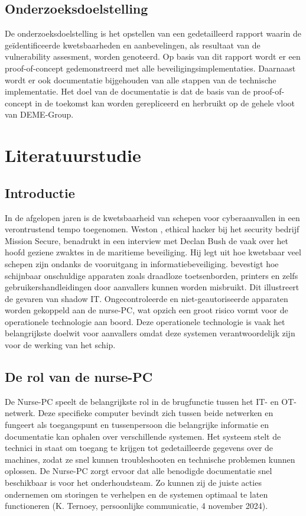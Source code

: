 \subsection{Onderzoeksdoelstelling}
De onderzoeksdoelstelling is het opstellen van een gedetailleerd rapport waarin de geïdentificeerde kwetsbaarheden en aanbevelingen, als resultaat van de vulnerability assesment, worden genoteerd.
Op basis van dit rapport wordt er een proof-of-concept gedemonstreerd met alle beveiligingsimplementaties.
Daarnaast wordt er ook documentatie bijgehouden van alle stappen van de technische implementatie.
Het doel van de documentatie is dat de basis van de proof-of-concept in de toekomst kan worden gerepliceerd en herbruikt op de gehele vloot van DEME-Group.



\section{Literatuurstudie}%
\label{sec:literatuurstudie}
\subsection{Introductie}
In de afgelopen jaren is de kwetsbaarheid van schepen voor cyberaanvallen in een verontrustend tempo toegenomen. Weston \textcite{Hecker2021}, ethical hacker bij het security bedrijf 
Mission Secure, benadrukt in een interview met Declan Bush de vaak over het hoofd geziene zwaktes in de maritieme beveiliging. Hij
legt uit hoe kwetsbaar veel schepen zijn ondanks de vooruitgang in informatiebeveiliging. \textcite{Hecker2021} bevestigt hoe schijnbaar onschuldige apparaten zoals draadloze toetsenborden, printers en 
zelfs gebruikershandleidingen door aanvallers kunnen worden misbruikt. Dit illustreert de gevaren van shadow IT.
Ongecontroleerde en niet-geautoriseerde apparaten worden gekoppeld aan de nurse-PC, wat opzich een groot risico vormt voor de operationele technologie aan boord. 
Deze operationele technologie is vaak het belangrijkste doelwit voor aanvallers omdat deze systemen verantwoordelijk zijn voor de werking van het schip.

\subsection{De rol van de nurse-PC}
De Nurse-PC speelt de belangrijkste rol in de brugfunctie tussen het IT- en OT-netwerk. Deze specifieke computer bevindt 
zich tussen beide netwerken en fungeert als toegangspunt en tussenpersoon die belangrijke informatie en documentatie kan ophalen over verschillende systemen.
Het systeem stelt de technici in staat om toegang te krijgen tot gedetailleerde gegevens over de 
machines, zodat ze snel kunnen troubleshooten en technische problemen kunnen oplossen. De Nurse-PC zorgt ervoor dat alle benodigde documentatie
snel beschikbaar is voor het onderhoudsteam. Zo kunnen zij de juiste acties ondernemen om storingen 
te verhelpen en de systemen optimaal te laten functioneren (K. Ternoey, persoonlijke communicatie, 4 november 2024).

